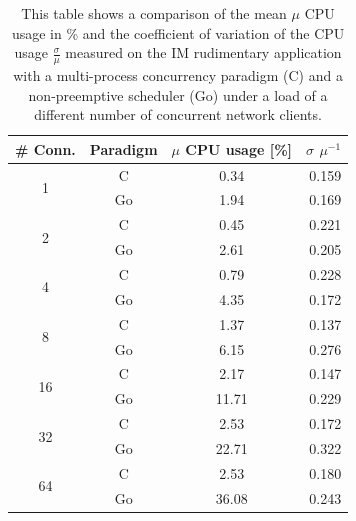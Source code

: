 \begin{table}[h]
	\centering
\begin{tabular}{|c|ccr|}
		\hline
	\# Conn.         &  Paradigm    & $\mu$ CPU usage [\%] & $\sigma$ $\mu^{-1}$ \\
	\hline
	\multirow{2}{*}{1} & C & 0.34 & 0.159   \\
	&\cellcolor[gray]{0.9} Go &\cellcolor[gray]{0.9} 1.94 &\cellcolor[gray]{0.9} 0.169  \\ \hline
	\multirow{2}{*}{2} & C & 0.45 & 0.221   \\
	&\cellcolor[gray]{0.9} Go &\cellcolor[gray]{0.9} 2.61 &\cellcolor[gray]{0.9} 0.205  \\ \hline
	\multirow{2}{*}{4} & C & 0.79 & 0.228   \\
&\cellcolor[gray]{0.9} Go &\cellcolor[gray]{0.9} 4.35 &\cellcolor[gray]{0.9} 0.172  \\ \hline
	\multirow{2}{*}{8} & C & 1.37 & 0.137   \\
&\cellcolor[gray]{0.9} Go &\cellcolor[gray]{0.9} 6.15 &\cellcolor[gray]{0.9} 0.276  \\ \hline
	\multirow{2}{*}{16} & C & 2.17 & 0.147   \\
&\cellcolor[gray]{0.9} Go &\cellcolor[gray]{0.9} 11.71 &\cellcolor[gray]{0.9} 0.229  \\ \hline
	\multirow{2}{*}{32} & C & 2.53 & 0.172   \\
&\cellcolor[gray]{0.9} Go &\cellcolor[gray]{0.9} 22.71 &\cellcolor[gray]{0.9} 0.322  \\ \hline
	\multirow{2}{*}{64} & C & 2.53 & 0.180   \\
&\cellcolor[gray]{0.9} Go &\cellcolor[gray]{0.9} 36.08 &\cellcolor[gray]{0.9} 0.243  \\ \hline
\end{tabular}
\bigskip	
\caption{This table shows a comparison of the mean $\mu$ CPU usage in \% and the coefficient of variation of the CPU usage $\frac{\sigma}{\mu}$ measured on the IM rudimentary application with a multi-process concurrency paradigm (C) and a non-preemptive scheduler (Go) under a load of a different number of concurrent network clients.}
\label{tab_results}
\end{table}

